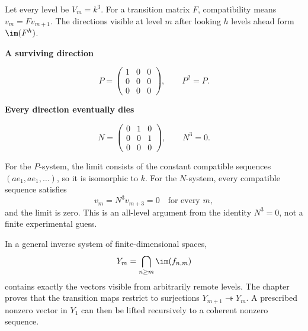 
Let every level be $V_m=k^3$. For a transition matrix $F$, compatibility means $v_m=Fv_{m+1}$. The directions visible at level $m$ after looking $h$ levels ahead form $\im(F^h)$.

\begin{minipage}[t]{.48\linewidth}\centering
{\sffamily\bfseries A surviving direction}\par
\[
P=\begin{pmatrix}1&0&0\\0&0&0\\0&0&0\end{pmatrix},\qquad P^2=P.
\]
\end{minipage}\hfill
\begin{minipage}[t]{.48\linewidth}\centering
{\sffamily\bfseries Every direction eventually dies}\par
\[
N=\begin{pmatrix}0&1&0\\0&0&1\\0&0&0\end{pmatrix},\qquad N^3=0.
\]
\end{minipage}

For the $P$-system, the limit consists of the constant compatible sequences $(a e_1,a e_1,\ldots)$, so it is isomorphic to $k$. For the $N$-system, every compatible sequence satisfies
\[
v_m=N^3v_{m+3}=0\quad\text{for every }m,
\]
and the limit is zero. This is an all-level argument from the identity $N^3=0$, not a finite experimental guess.

In a general inverse system of finite-dimensional spaces,
\[
Y_m=\bigcap_{n\ge m}\im(f_{n,m})
\]
contains exactly the vectors visible from arbitrarily remote levels. The chapter proves that the transition maps restrict to surjections $Y_{m+1}\twoheadrightarrow Y_m$. A prescribed nonzero vector in $Y_1$ can then be lifted recursively to a coherent nonzero sequence.

